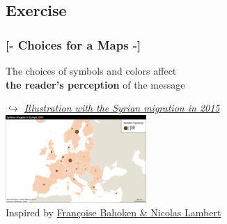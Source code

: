 \documentclass[xcolor=x11names,compress]{beamer}
\renewcommand{\(}{\begin{columns}}
\renewcommand{\)}{\end{columns}}
\newcommand{\<}[1]{\begin{column}{#1}}
\renewcommand{\>}{\end{column}}
\begin{document}
\subsection{Exercise}
\begin{frame} %
\frametitle{\textcolor{brique}{[-  \textbf{Choices for a Maps} -]}}
\begin{center}
    \Large{\textcolor{siap}{The choices of symbols and colors affect \\
     \textbf{the reader's perception} of the message}} \\ \vspace{0.5cm}

    \large{\textcolor{siap}{\textit{$\hookrightarrow$
    \href{https://observablehq.com/@xtopheb/visualizing-statistics-on-maps}{Illustration with the Syrian migration in 2015}}}} \\ \vspace{0.5cm}
    \includegraphics[width = 0.4\textwidth]{Syrians-MapSize1.png}\\ 
     \hfill\textcolor{gris}{ \footnotesize{Inspired by \href{https://neocarto.github.io/syrians/}{Françoise Bahoken \& Nicolas Lambert}}}
\end{center}
\end{frame}
\end{document}
